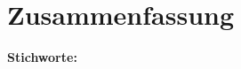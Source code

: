 \chapter{Zusammenfassung}
\begin{german}


\vspace*{2\baselineskip}

\noindent
\textbf{Stichworte:}
\end{german}
